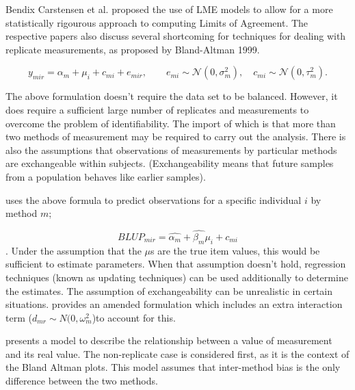 \documentclass[12pt, a4paper]{report}
\theoremstyle{plain}
\theoremstyle{definition}
\theoremstyle{remark}
\begin{document}
	
	Bendix Carstensen et al. proposed the use of LME models to allow for a more statistically rigourous approach to computing Limits of Agreement.  The respective papers also discuss several shortcoming for techniques for dealing with replicate measurements, as proposed by Bland-Altman 1999.
	
	
	
	\begin{equation}
	y_{mir}  = \alpha_{m} + \mu_{i} + c_{mi} + e_{mir}, \qquad  e_{mi}
	\sim \mathcal{N}(0,\sigma^{2}_{m}), \quad c_{mi} \sim \mathcal{N}(0,\tau^{2}_{m}).
	\end{equation}
	
	
	The above formulation doesn't require the data set to be balanced.
	However, it does require a sufficient large number of replicates
	and measurements to overcome the problem of identifiability. The
	import of which is that more than two methods of measurement may
	be required to carry out the analysis. There is also the
	assumptions that observations of measurements by particular
	methods are exchangeable within subjects. (Exchangeability means
	that future samples from a population behaves like earlier
	samples).
	
	
	\citet{BXC2004} uses the above formula to predict observations for
	a specific individual $i$ by method $m$;
	
	\begin{equation}BLUP_{mir} = \hat{\alpha_{m}} + \hat{\beta_{m}}\mu_{i} +
	c_{mi} \end{equation}. Under the assumption that the $\mu$s are
	the true item values, this would be sufficient to estimate
	parameters. When that assumption doesn't hold, regression
	techniques (known as updating techniques) can be used additionally
	to determine the estimates. The assumption of exchangeability can
	be unrealistic in certain situations. \citet{BXC2004} provides an
	amended formulation which includes an extra interaction term ($
	d_{mr} \sim N(0,\omega^{2}_{m}$)to account for this.
	
	
	
	\citet{BXC2004} presents a model to describe the relationship between a value of measurement and its
	real value. The non-replicate case is considered first, as it is the context of the Bland Altman plots. This model assumes that inter-method bias is the only difference between the two methods.
	
\end{document}
